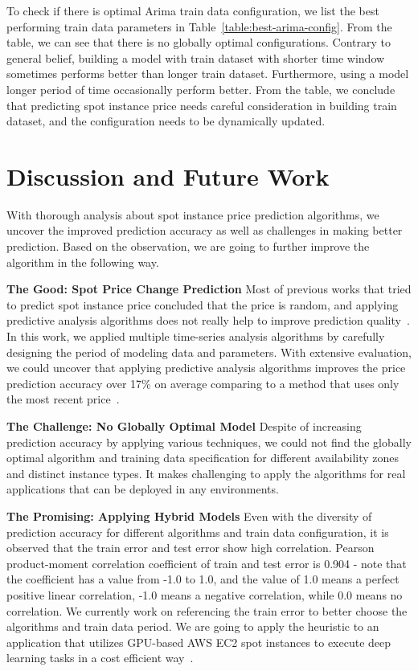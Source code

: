 \documentclass[graybox]{svmult}
\begin{document}
To check if there is optimal Arima train data configuration, we list the best performing train data parameters in Table~\ref{table:best-arima-config}. From the table, we can see that there is no globally optimal configurations. Contrary to general belief, building a model with train dataset with shorter time window sometimes performs better than longer train dataset. Furthermore, using a model longer period of time occasionally perform better. From the table, we conclude that predicting spot instance price needs careful consideration in building train dataset, and the configuration needs to be dynamically updated. 


\section{Discussion and Future Work}
With thorough analysis about spot instance price prediction algorithms, we uncover the improved prediction accuracy as well as challenges in making better prediction. Based on the observation, we are going to further improve the algorithm in the following way.  

\textbf{The Good: Spot Price Change Prediction} Most of previous works that tried to predict spot instance price concluded that the price is random, and applying predictive analysis algorithms does not really help to improve prediction quality~\cite{spot-instance-pricing-analysis,spot-price-han-arima}. In this work, we applied multiple time-series analysis algorithms by carefully designing the period of modeling data and parameters. With extensive evaluation, we could uncover that applying predictive analysis algorithms improves the price prediction accuracy over 17\% on average comparing to a method that uses only the most recent price~\cite{deep-spot-cloud,not-bid-cloud}.

\textbf{The Challenge: No Globally Optimal Model} Despite of increasing prediction accuracy by applying various techniques, we could not find the globally optimal algorithm and training data specification for different availability zones and distinct instance types. It makes challenging to apply the algorithms for real applications that can be deployed in any environments. 

\textbf{The Promising: Applying Hybrid Models} Even with the diversity of prediction accuracy for different algorithms and train data configuration, it is observed that the train error and test error show high correlation. Pearson product-moment correlation coefficient of train and test error is 0.904 - note that the coefficient has a value from -1.0 to 1.0, and the value of 1.0 means a perfect positive linear correlation, -1.0 means a negative correlation, while 0.0 means no correlation. We currently work on referencing the train error to better choose the algorithms and train data period. We are going to apply the heuristic to an application that utilizes GPU-based AWS EC2 spot instances to execute deep learning tasks in a cost efficient way~\cite{deep-spot-cloud}. 
\end{document}
